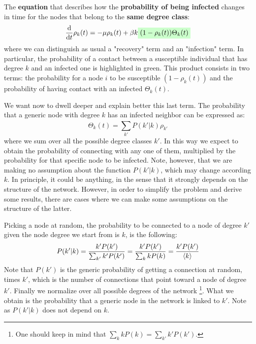 \documentclass[../main/main.tex]{subfiles}
\begin{document}
The \textbf{equation} that describes how the \textbf{probability of being infected} changes in time for the nodes that belong to the \textbf{same degree class}:
\begin{equation}
  \dv{}{t}  \rho _k (t) = - \mu \rho _k (t) + \beta k \mathcolorbox{green!20}{(1- \rho _k (t)) \Theta _k (t)}
\end{equation}
where we can distinguish as usual a "recovery" term and an "infection" term. In particular, the probability of a contact between a susceptible individual that has degree \( k \) and an infected one is highlighted in green.
This product consists in two terms: the probability for a node $i$ to be susceptible \( (1- \rho _k (t)) \) and the probability of having contact with an infected \( \Theta _k (t) \).

We want now to dwell deeper and explain better this last term. The probability that a generic node with degree \( k \) has an infected neighbor can be expressed as:
\begin{equation}
\label{eqn:theta_k(t)}
  \Theta _k(t) = \sum_{k'}^{} P(k'|k)\rho _{k'}
\end{equation}
where we sum over all the possible degree classes $k'$. In this way we expect to obtain the probability of connecting with any one of them, multiplied by the probability for that specific node to be infected.
Note, however, that we are making no assumption about the function \(  P(k'|k) \), which may change according \( k \). In principle, it could be anything, in the sense that it strongly depends on the structure of the network. However, in order to simplify the problem and derive some results, there are cases where we can make some assumptions on the structure of the latter.

Picking a node at random, the probability to be connected to a node of degree $k'$ given the node degree we start from is $k$, is the following:
\begin{equation}
  P(k'|k) = \frac{k'P(k')}{\sum_{k'} k' P(k')  } = \frac{k'P(k')}{\sum_{k} k P(k)  } = \frac{k'P(k')}{\expval{k}  }
\end{equation}
Note that \( P(k') \) is the generic probability of getting a connection at random, times \( k' \), which is the number of connections that point toward a node of degree $k'$. Finally we normalize over all possible degrees of the network \footnote{One should keep in mind that $\sum_{k} kP(k) = \sum_{k'} k'P(k')$.}. What we obtain is the probability that a generic node in the network is linked to \( k' \).  Note as \( P(k'|k) \) does not depend on \( k \).
\end{document}
